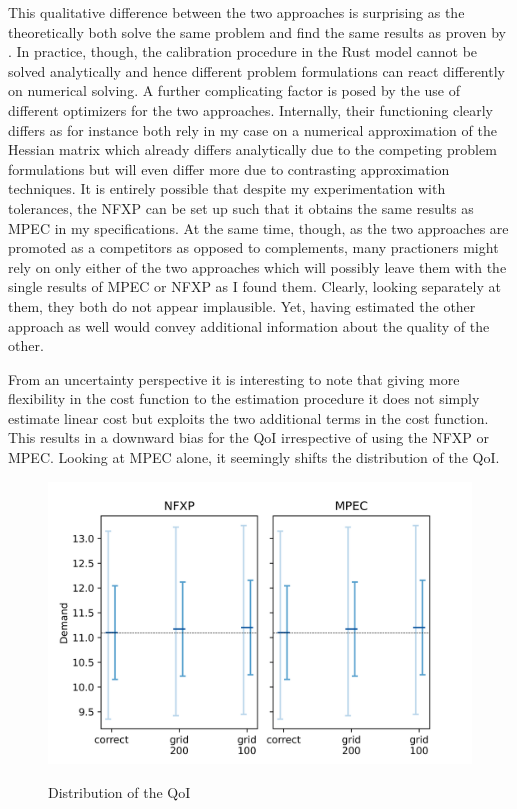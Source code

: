 This qualitative difference between the two approaches is surprising as the theoretically both solve the same problem and find the same results as proven by \cite{Su.Judd.2012}. In practice, though, the calibration procedure in the Rust model cannot be solved analytically and hence different problem formulations can react differently on numerical solving. A further complicating factor is posed by the use of different optimizers for the two approaches. Internally, their functioning clearly differs as for instance both rely in my case on a numerical approximation of the Hessian matrix which already differs analytically due to the competing problem formulations but will even differ more due to contrasting approximation techniques. It is entirely possible that despite my experimentation with tolerances, the NFXP can be set up such that it obtains the same results as MPEC in my specifications. At the same time, though, as the two approaches are promoted as a competitors as opposed to complements, many practioners might rely on only either of the two approaches which will possibly leave them with the single results of MPEC or NFXP as I found them. Clearly, looking separately at them, they both do not appear implausible. Yet, having estimated the other approach as well would convey additional information about the quality of the other.

From an uncertainty perspective it is interesting to note that giving more flexibility in the cost function to the estimation procedure it does not simply estimate linear cost but exploits the two additional terms in the cost function. This results in a downward bias for the QoI irrespective of using the NFXP or MPEC. Looking at MPEC alone, it seemingly shifts the distribution of the QoI.






\begin{figure}[H]
	\caption{Distribution of the QoI}
	\vspace*{-4mm}
	\centering
	\includegraphics[scale=0.9]{../figures/figure_7.png}
	\label{figure7}
\end{figure}

